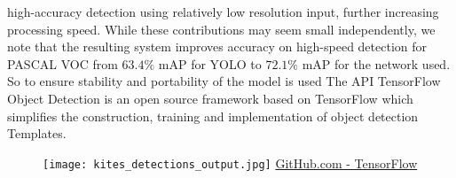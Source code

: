 high-accuracy detection using relatively low resolution input, further
increasing processing speed. While these contributions may seem small
independently, we note that the resulting system improves accuracy on high-speed
detection for PASCAL VOC from $63.4\%$ mAP for YOLO to $72.1\%$ mAP for the
network used.\cite{liu2016ssd,Huang2016SpeedAccuracyTF}
So to ensure stability and portability of the model is used The API TensorFlow
Object Detection is an open source framework based on TensorFlow which
simplifies the construction, training and implementation of object detection
Templates.\cite{objectdetectionAPI}
%
%
\begin{figure}[!h]
	\centering
	\texttt{[image: kites\_detections\_output.jpg]}
	{\href{https://github.com/tensorflow/models/tree/master/research/object_detection}{GitHub.com - TensorFlow}}
	\label{fig:kites-detections-output}
\end{figure}
%
%
